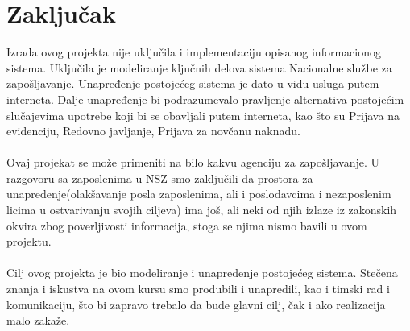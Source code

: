 \section{Zaklju\v cak}

Izrada ovog projekta nije uključila i implementaciju opisanog informacionog sistema.
Uključila je modeliranje ključnih delova sistema Nacionalne službe za zapošljavanje. 
Unapređenje postojećeg sistema je dato u vidu usluga putem interneta. Dalje unapređenje bi podrazumevalo pravljenje alternativa postojećim slučajevima upotrebe koji bi se obavljali putem interneta, kao što su Prijava na evidenciju, Redovno javljanje, Prijava za novčanu naknadu.
\\
\\ Ovaj projekat se može primeniti na bilo kakvu agenciju za zapošljavanje.
U razgovoru sa zaposlenima u NSZ smo zaključili da prostora za unapređenje(olakšavanje posla zaposlenima, ali i poslodavcima i nezaposlenim licima u ostvarivanju svojih ciljeva) ima još, ali neki od njih izlaze iz zakonskih okvira zbog poverljivosti informacija, stoga se njima nismo bavili u ovom projektu.
\\
\\
Cilj ovog projekta je bio modeliranje i unapređenje postojećeg sistema. Stečena znanja i iskustva na ovom kursu smo produbili i unapredili, kao i timski rad i komunikaciju, što bi zapravo trebalo da bude glavni cilj, čak i ako realizacija malo zakaže.